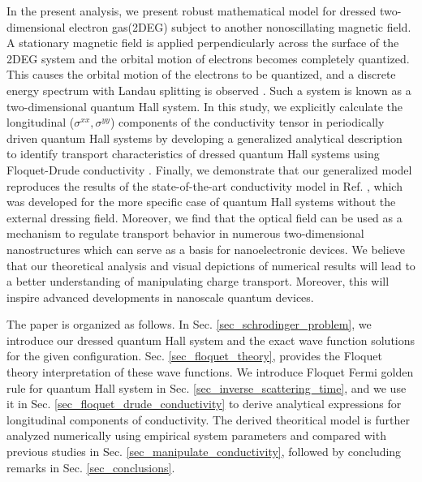 In the present analysis, we present robust mathematical model for dressed two-dimensional electron gas(2DEG) subject to another nonoscillating magnetic field.
A stationary magnetic field is applied perpendicularly across the surface of the 2DEG system and the orbital motion of electrons becomes completely quantized. This causes the orbital motion of the electrons to be quantized, and a discrete energy spectrum with Landau splitting is observed \cite{landau30}.
Such a system is known as a two-dimensional quantum Hall system. In this study, we explicitly calculate the longitudinal  ($\sigma^{xx},\sigma^{yy}$) components of the conductivity tensor in periodically driven quantum Hall systems by developing a generalized analytical description to identify transport characteristics of dressed quantum Hall systems using Floquet-Drude conductivity \cite{wackerl20}.
Finally, we demonstrate that our generalized model reproduces the results of
the state-of-the-art conductivity model in Ref. \cite{endo09}, which was developed for the more specific case of quantum Hall systems without the external dressing field.
Moreover, we find that the optical field can be used as a mechanism to regulate transport behavior in numerous two-dimensional nanostructures which can serve as a basis for nanoelectronic devices. We believe that our theoretical analysis and visual depictions of numerical results will lead to a better understanding of manipulating charge transport. Moreover, this will inspire advanced  developments in nanoscale quantum devices.

The paper is organized as follows. In Sec.  \ref{sec_schrodinger_problem}, we introduce our dressed quantum Hall system and the exact wave function solutions for the given configuration. Sec. \ref{sec_floquet_theory}, provides the Floquet theory interpretation of these wave functions.
We introduce Floquet Fermi golden rule for quantum Hall system in Sec. \ref{sec_inverse_scattering_time}, and we use it in Sec. \ref{sec_floquet_drude_conductivity} to derive analytical expressions for longitudinal components of conductivity.
The derived theoritical model is further analyzed numerically using empirical system parameters and compared with previous studies in Sec. \ref{sec_manipulate_conductivity}, followed by concluding remarks in Sec. \ref{sec_conclusions}.
